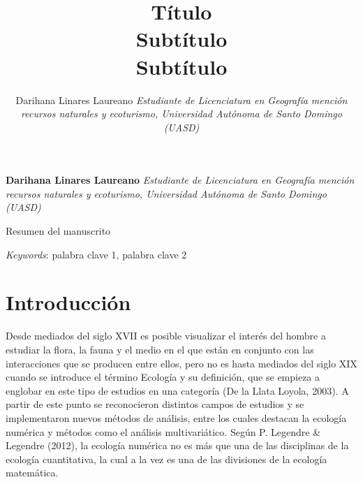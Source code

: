 \documentclass[11pt,]{article}
\title{Título\\
Subtítulo\\
Subtítulo  }
\author{\Large Darihana Linares Laureano\vspace{0.05in} \newline\normalsize\emph{Estudiante de Licenciatura en Geografía mención recursos naturales y
ecoturismo, Universidad Autónoma de Santo Domingo (UASD)}  }
\date{}
\newcommand*{\authorfont}{\fontfamily{phv}\selectfont}
\renewenvironment{abstract}
 {{%
    \setlength{\leftmargin}{0mm}
    \setlength{\rightmargin}{\leftmargin}%
  }%
  \relax}
 {\endlist}
\begin{document}
	
%

{%
\setlength{\parindent}{0pt}
\thispagestyle{plain}
{\fontsize{18}{20}\selectfont\raggedright 
\maketitle  %

}

{
   \vskip 13.5pt\relax \normalsize\fontsize{11}{12} 
\textbf{\authorfont Darihana Linares Laureano} \hskip 15pt \emph{\small Estudiante de Licenciatura en Geografía mención recursos naturales y
ecoturismo, Universidad Autónoma de Santo Domingo (UASD)}   

}

}








\begin{abstract}

    \hbox{\vrule height .2pt width 39.14pc}

    \vskip 8.5pt %

\noindent Resumen del manuscrito


\vskip 8.5pt \noindent \emph{Keywords}: palabra clave 1, palabra clave 2 \par

    \hbox{\vrule height .2pt width 39.14pc}



\end{abstract}


\vskip 6.5pt


\noindent  \section{Introducción}\label{introducciuxf3n}

Desde mediados del siglo XVII es posible visualizar el interés del
hombre a estudiar la flora, la fauna y el medio en el que están en
conjunto con las interacciones que se producen entre ellos, pero no es
hasta mediados del siglo XIX cuando se introduce el término Ecología y
su definición, que se empieza a englobar en este tipo de estudios en una
categoría (De la Llata Loyola, 2003). A partir de este punto se
reconocieron distintos campos de estudios y se implementaron nuevos
métodos de análisis, entre los cuales destacan la ecología numérica y
métodos como el análisis multivariático. Según P. Legendre \& Legendre
(2012), la ecología numérica no es más que una de las disciplinas de la
ecología cuantitativa, la cual a la vez es una de las divisiones de la
ecología matemática.
\end{document}
